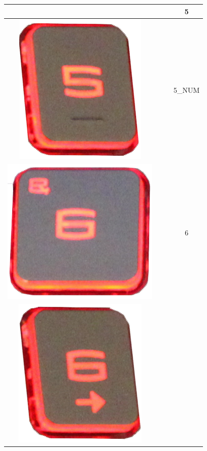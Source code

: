 \begin{longtable}{cccc}
\begin{minipage}[c]{.3\textwidth}
\vspace{0.2cm}
\end{minipage} & & & 5\\
\hline
\begin{minipage}[c]{.3\textwidth}
\vspace{0.2cm}
\includegraphics[scale=0.1]{Images/KeyMapping/5_NUM}
\vspace{0.2cm}
\end{minipage} & & & 5\_NUM\\
\hline
\begin{minipage}[c]{.3\textwidth}
\vspace{0.2cm}
\includegraphics[scale=0.1]{Images/KeyMapping/6}
\vspace{0.2cm}
\end{minipage} & & & 6\\
\hline
\begin{minipage}[c]{.3\textwidth}
\vspace{0.2cm}
\includegraphics[scale=0.1]{Images/KeyMapping/6_RIGHT}

\end{minipage}
\end{longtable}
